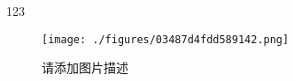 
123

\begin{figure}[ht]
\centering
\texttt{[image: ./figures/03487d4fdd589142.png]}
\caption{请添加图片描述} \label{fig_test1}
\end{figure}